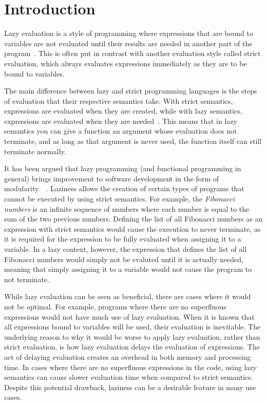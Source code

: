\chapter{Introduction}
\label{chapter:intro}
Lazy evaluation is a style of programming where expressions that are bound to variables
are not evaluated until their results are needed in another part of the
program~\cite{Lazyeval6:online}. This is often put in contrast with another
evaluation style called strict evaluation, which always evaluates expressions
immediately as they are to be bound to variables. 

The main difference between lazy and strict programming languages is the steps
of evaluation that their respective semantics take. With strict semantics,
expressions are evaluated when they are created, while with lazy semantics,
expressions are evaluated when they are needed~\cite{ThunkHas27:online}.
This means that in lazy semantics you can give a function an argument
whose evaluation does not terminate, and as long as
that argument is never used, the function itself can still terminate normally.

It has been argued that lazy programming (and functional programming in general)
brings improvement to software development in the form of
modularity~\cite{Hu1989}~\cite{Hu2015}. Laziness allows the creation of certain
types of programs that cannot be executed by using strict semantics.
For example, the \textit{Fibonacci numbers} is an infinite sequence of numbers
where each number is equal to the sum of the two previous numbers.
Defining the list of all Fibonacci numbers as an expression with strict semantics would
cause the execution to never terminate, as it is required for the expression to be
fully evaluated when assigning it to a variable. In a lazy context, however,
the expression that defines the list of all Fibonacci numbers would simply not
be evaluted until it is actually needed, meaning that simply assigning it to a
variable would not cause the program to not terminate.

While lazy evaluation can be seen as beneficial, there are cases where it
would not be optimal. For example, programs where there are
no superfluous expressions would not have much use of lazy evaluation. When it
is known that all expressions bound to variables will be used,
their evaluation is inevitable. The underlying reason to why it would be worse
to apply lazy evaluation, rather than strict evaluation, is how lazy evaluation
delays the evaluation of expressions. The act of delaying evaluation creates
an overhead in both memory and processing time.
In cases where there are no superfluous expressions in the code, using lazy
semantics can cause slower evaluation time when compared to
strict semantics. Despite this potential drawback, laziness can be a desirable
feature in many use cases. 

